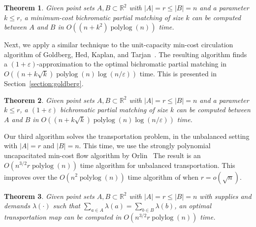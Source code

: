 \documentclass[11pt]{article}
\def\polylog{\mathop{\mathrm{polylog}}}
\def\eps{\varepsilon}
\def\tsupply{\lambda}
\theoremstyle{plain}
\newtheorem{theorem}{Theorem}
\begin{document}
\begin{theorem}
\label{theorem:hung}
Given point sets $A, B \subset \mathbb{R}^2$ with $|A| = r \leq |B| = n$ and a 
parameter $k \leq r$, a minimum-cost bichromatic partial matching of size $k$ 
can be computed between $A$ and $B$ in $O((n + k^2)\polylog(n))$ time.
\end{theorem}


Next, we apply a similar technique to the unit-capacity min-cost circulation 
algorithm of Goldberg, Hed, Kaplan, and Tarjan~\cite{GHKT17}.
The resulting algorithm finds a $(1 + \eps)$-approximation to the optimal 
bichromatic partial matching in $O((n + k\sqrt{k})\polylog(n)\log(n/\eps))$ 
time.
This is presented in Section~\ref{section:goldberg}.

\begin{theorem}
\label{theorem:gmcm}
Given point sets $A, B \subset \mathbb{R}^2$ with $|A| = r \leq |B| = n$ and a 
parameter $k \leq r$, a $(1+\eps)$ bichromatic partial matching of size $k$ 
can be computed between $A$ and $B$ in 
$O((n + k\sqrt{k})\polylog(n)\log(n/\eps))$ time.
\end{theorem}


Our third algorithm solves the transportation problem, in the unbalanced 
setting with $|A| = r$ and $|B| = n$.
This time, we use the strongly polynomial uncapacitated min-cost flow algorithm
by Orlin~%
The result is an $O(n^{3/2}r\polylog(n))$ time algorithm for unbalanced 
transportation.
This improves over the $O(n^2 \polylog(n))$ time algorithm of %
when $r = o(\sqrt{n})$.

\begin{theorem}
\label{theorem:orlin}
Given point sets $A, B \subset \mathbb{R}^2$ with $|A| = r \leq |B| = n$ with
supplies and demands $\tsupply(\cdot)$ such that 
$\sum_{a \in A} \tsupply(a) = \sum_{b \in B} \tsupply(b)$, an optimal 
transportation map can be computed in $O(n^{3/2}r\polylog(n))$ time.
\end{theorem}


\end{document}
